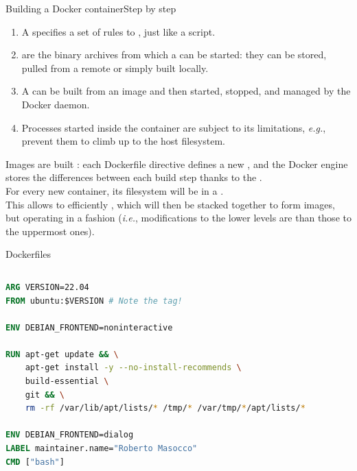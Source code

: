 \begin{frame}{Building a Docker container}{Step by step}
	\begin{enumerate}
		\item A  specifies a set of rules to , just like a script.
		\item {} are the binary archives from which a  can be started: they can be stored, pulled from a remote  or simply built locally.
		\item A  can be built from an image and then started, stopped, and managed by the Docker daemon.
		\item Processes started inside the container are subject to its limitations, \emph{e.g.},  prevent them to climb up to the host filesystem.
	\end{enumerate}
	Images are built : each Dockerfile directive defines a new , and the Docker engine stores the differences between each build step thanks to the .\\
	For every new container, its filesystem will be in a .\\
	This allows to efficiently , which will then be stacked together to form images, but operating in a  fashion (\emph{i.e.}, modifications to the lower levels are  than those to the uppermost ones).
\end{frame}

\begin{frame}[fragile]{Dockerfiles}
	\begin{columns}
		\begin{lstlisting}[language=Dockerfile, caption=Minimal example of a Dockerfile running a Bash shell in a Ubuntu container.]
ARG VERSION=22.04
FROM ubuntu:$VERSION # Note the tag!

ENV DEBIAN_FRONTEND=noninteractive

RUN apt-get update && \
    apt-get install -y --no-install-recommends \
    build-essential \
    git && \
    rm -rf /var/lib/apt/lists/* /tmp/* /var/tmp/*/apt/lists/*

ENV DEBIAN_FRONTEND=dialog
LABEL maintainer.name="Roberto Masocco"
CMD ["bash"]
\end{lstlisting}
	\end{columns}
\end{frame}

